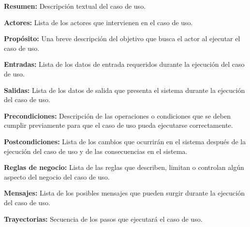 \documentclass[12pt]{book}
\begin{document}
\begin{objetivos}
	\item {\bf Resumen:} Descripción textual del caso de uso.
	\item {\bf Actores:} Lista de los actores que intervienen en el caso de uso.
	\item {\bf Propósito:} Una breve descripción del objetivo que busca el actor al ejecutar el caso de uso.
	\item {\bf Entradas:} Lista de los datos de entrada requeridos durante la ejecución del caso de uso.
	\item {\bf Salidas:} Lista de los datos de salida que presenta el sistema durante la ejecución del caso de uso.
	\item {\bf Precondiciones:} Descripción de las operaciones o condiciones que se deben cumplir previamente para que el caso de uso pueda ejecutarse correctamente.
	\item {\bf Postcondiciones:} Lista de los cambios que ocurrirán en el sistema después de la ejecución del caso de uso y de las consecuencias en el sistema.
	\item {\bf Reglas de negocio:} Lista de las reglas que describen, limitan o controlan algún aspecto del negocio del caso de uso.
	\item {\bf Mensajes:} Lista de los posibles mensajes que pueden surgir durante la ejecución del caso de uso.
	\item {\bf Trayectorias:} Secuencia de los pasos que ejecutará el caso de uso.
\end{objetivos}

\newpage
\end{document}

